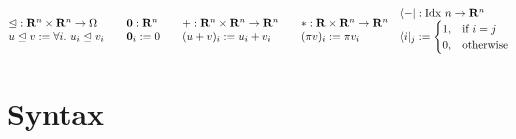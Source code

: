 \documentclass[submission,copyright,creativecommons]{eptcs}
\begin{document}
\begin{definition}
  ~\\
$    \begin{matrix*}[l]
      {\subres} : \mathbf{R}^n \times \mathbf{R}^n \to \Omega \\
      u \subres v := \forall i.~u_i \subres v_i
    \end{matrix*}
    \qquad
    \begin{matrix*}[l]
      \vct 0 : \mathbf{R}^n \\
      \vct 0_i := 0
    \end{matrix*}
    \qquad
    \begin{matrix*}[l]
      + : \mathbf{R}^n \times \mathbf{R}^n \to \mathbf{R}^n \\
      (u + v)_i := u_i + v_i
    \end{matrix*}
    \qquad
    \begin{matrix*}[l]
      * : \mathbf R \times \mathbf{R}^n \to \mathbf{R}^n \\
      (\pi v)_i := \pi v_i
    \end{matrix*}
    \quad
    \begin{matrix*}[l]
      \langle {-} \rvert : \mathrm{Idx}~n \to \mathbf{R}^n \\
      \langle i \rvert_j :=
      \begin{cases}
        1, & \textrm{if }i = j \\
        0, & \textrm{otherwise} \\
      \end{cases}
    \end{matrix*}$
\end{definition}

\section{Syntax}\label{sec:syntax}
\end{document}
